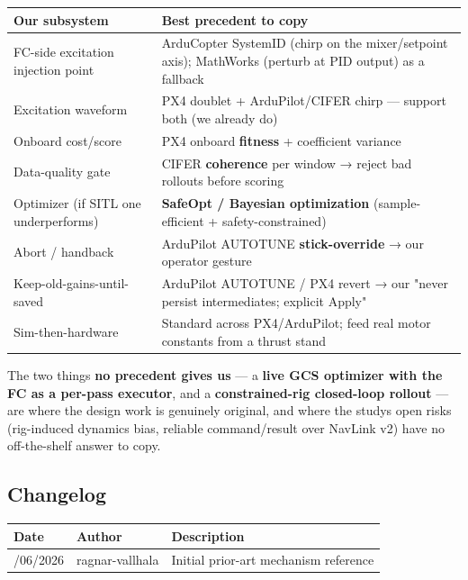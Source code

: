 \documentclass[
  11pt,
]{article}
\begin{document}
\begin{longtable}[]{@{}ll@{}}
\toprule\noalign{}
Our subsystem & Best precedent to copy \\
\midrule\noalign{}
\endhead
\bottomrule\noalign{}
\endlastfoot
FC-side excitation injection point & ArduCopter SystemID (chirp on the
mixer/setpoint axis); MathWorks (perturb at PID output) as a fallback \\
Excitation waveform & PX4 doublet + ArduPilot/CIFER chirp --- support
both (we already do) \\
Onboard cost/score & PX4 onboard \textbf{fitness} + coefficient
variance \\
Data-quality gate & CIFER \textbf{coherence} per window → reject bad
rollouts before scoring \\
Optimizer (if SITL one underperforms) & \textbf{SafeOpt / Bayesian
optimization} (sample-efficient + safety-constrained) \\
Abort / handback & ArduPilot AUTOTUNE \textbf{stick-override} → our
operator gesture \\
Keep-old-gains-until-saved & ArduPilot AUTOTUNE / PX4 revert → our
"never persist intermediates; explicit Apply" \\
Sim-then-hardware & Standard across PX4/ArduPilot; feed real motor
constants from a thrust stand \\
\end{longtable}

The two things \textbf{no precedent gives us} --- a \textbf{live GCS
optimizer with the FC as a per-pass executor}, and a
\textbf{constrained-rig closed-loop rollout} --- are where the design
work is genuinely original, and where the study\textquotesingle s open
risks (rig-induced dynamics bias, reliable command/result over NavLink
v2) have no off-the-shelf answer to copy.

\hypertarget{changelog}{%
\subsection{Changelog}\label{changelog}}

\begin{longtable}[]{@{}lll@{}}
\toprule\noalign{}
Date & Author & Description \\
\midrule\noalign{}
\endhead
\bottomrule\noalign{}
\endlastfoot
15/06/2026 & ragnar-vallhala & Initial prior-art mechanism reference \\
\end{longtable}
\end{document}
